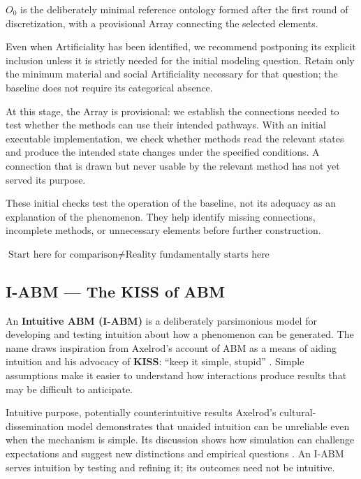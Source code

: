 \documentclass[11pt,a4paper]{article}
\newenvironment{fitdisplay}{\par\medskip\noindent\begin{lrbox}{\displaybox}$\displaystyle}{%
$\end{lrbox}\makebox[\linewidth][c]{\ifdim\wd\displaybox>\linewidth\resizebox{\linewidth}{!}{\usebox{\displaybox}}\else\usebox{\displaybox}\fi}\par\medskip}
\begin{document}
\(O_0\) is the deliberately minimal reference ontology formed after the first round of discretization, with a provisional Array connecting the selected elements.

Even when Artificiality has been identified, we recommend postponing its explicit inclusion unless it is strictly needed for the initial modeling question. Retain only the minimum material and social Artificiality necessary for that question; the baseline does not require its categorical absence.

At this stage, the Array is provisional: we establish the connections needed to test whether the methods can use their intended pathways. With an initial executable implementation, we check whether methods read the relevant states and produce the intended state changes under the specified conditions. A connection that is drawn but never usable by the relevant method has not yet served its purpose.

These initial checks test the operation of the baseline, not its adequacy as an explanation of the phenomenon. They help identify missing connections, incomplete methods, or unnecessary elements before further construction.

\begin{fitdisplay}
\boxed{
\text{Start here for comparison}
\neq
\text{Reality fundamentally starts here}
}
\end{fitdisplay}

\subsection{I-ABM --- The KISS of ABM}

An \textbf{Intuitive ABM (I-ABM)} is a deliberately parsimonious model for developing and testing intuition about how a phenomenon can be generated. The name draws inspiration from Axelrod's account of ABM as a means of aiding intuition and his advocacy of \textbf{KISS}: ``keep it simple, stupid'' \cite[pp.~4--6]{axelrod_complexity_1997}. Simple assumptions make it easier to understand how interactions produce results that may be difficult to anticipate.

\begin{principle}{Intuitive purpose, potentially counterintuitive results}
Axelrod's cultural-dissemination model demonstrates that unaided intuition can be unreliable even when the mechanism is simple. Its discussion shows how simulation can challenge expectations and suggest new distinctions and empirical questions \cite[pp.~219--220]{axelrod_dissemination_1997}. An I-ABM serves intuition by testing and refining it; its outcomes need not be intuitive.
\end{principle}
\end{document}
